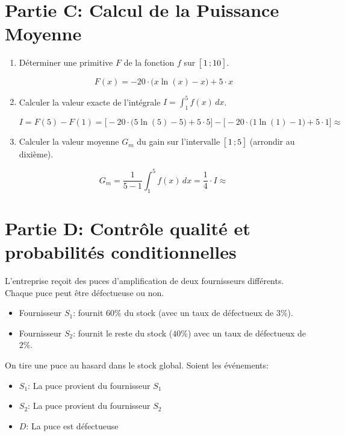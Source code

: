 \documentclass[11pt, a4paper]{report}
\begin{document}
\section*{Partie C\@: Calcul de la Puissance Moyenne}

\begin{enumerate}[resume]
    \item Déterminer une primitive $F$ de la fonction $f$ sur $\bigl[ \, 1 \, ; 10 \,\bigl]$.
    \begin{blocvisible}[height=1.5]
\[F(x) = -20 \cdot \Big(x \ln(x) - x\Big) + 5 \cdot x\]
    \end{blocvisible}
    \item Calculer la valeur exacte de l'intégrale $I = \displaystyle\int_{1}^{5} f(x) \, dx$.
    \begin{blocvisible}[height=1.5]    
\[I = F(5) - F(1) = \Big[-20 \cdot \Big(5 \ln(5) - 5\Big) + 5 \cdot 5\Big] - \Big[-20 \cdot \Big(1 \ln(1) - 1\Big) + 5 \cdot 1\Big]  \approx  \]
    \end{blocvisible}
    \medskip
\item Calculer la valeur moyenne $G_m$ du gain sur l'intervalle $\bigl[ \, 1 \, ; 5 \,\bigl]$ (arrondir au dixième).
    \begin{blocvisible}[height=1.5]
\[G_m = \frac{1}{5-1} \int_{1}^{5} f(x) \, dx = \frac{1}{4} \cdot I \approx \]
    \end{blocvisible}
\end{enumerate}

\section*{Partie D\@: Contrôle qualité et probabilités conditionnelles}

L'entreprise reçoit des puces d'amplification de deux fournisseurs différents. Chaque puce peut être défectueuse ou non.

\begin{itemize}
    \item Fournisseur $S_1$\@: fournit $60 \%$ du stock (avec un taux de défectueux de $3 \%$).
    \item Fournisseur $S_2$\@: fournit le reste du stock ($40 \%$) avec un taux de défectueux de $2 \%$.
\end{itemize}

On tire une puce au hasard dans le stock global. Soient les événements:

\begin{itemize}
    \item $S_1$: \og{}La puce provient du fournisseur $S_1$\fg{}
    \item $S_2$: \og{}La puce provient du fournisseur $S_2$\fg{}
    \item $D$: \og{}La puce est défectueuse\fg{}
\end{itemize}
\end{document}
